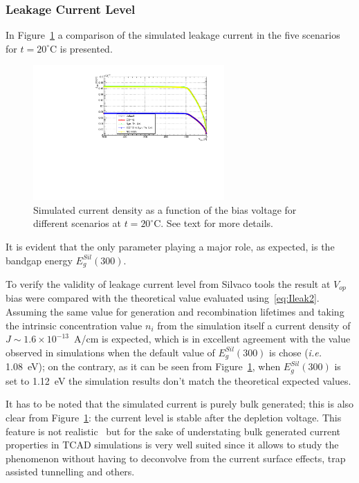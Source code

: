 \subsubsection{Leakage Current Level}




In Figure~\ref{fig:ILeak20C} a comparison of the simulated leakage current in the five scenarios for $t=20^{\circ}$C is presented.
\begin{figure}[!htbp]
\centering
\includegraphics[width=0.65\textwidth]{currents_T20_scenarios.pdf}
\caption{\label{fig:ILeak20C}Simulated current density as a function of the bias voltage for different 
scenarios at $t=20^{\circ}$C. See text for more details.}
\end{figure}
It is evident that the only parameter playing a major role, as expected, is the bandgap energy $E^{Sil}_g(300)$. 



To verify the validity of leakage current level  from Silvaco tools the result at $V_{op}$ bias 
were compared with the theoretical value evaluated using~\ref{eq:Ileak2}. Assuming the same value
for generation and recombination lifetimes and taking the intrinsic concentration value $n_i$ from 
the simulation itself a current density of $J\sim1.6\times10^{-13}$~A/cm is expected, which 
is in excellent agreement with the value observed in simulations when the default value of 
$E^{Sil}_g(300)$ is chose ({\it i.e.} 1.08~eV); on the contrary, as it can be seen from Figure~\ref{fig:ILeak20C}, when $E^{Sil}_g(300)$ is set to 1.12~eV the simulation results don't match 
the theoretical expected values.

It has to be noted that  the simulated current is purely bulk generated; this is also clear from 
Figure~\ref{fig:ILeak20C}: the current level is stable after the depletion voltage. This feature 
is not realistic~\cite{CALZOLARI19721003} but for the sake of understating bulk generated 
current properties in TCAD simulations is very well suited since it allows to study the 
phenomenon without having to deconvolve from the current surface effects, trap assisted tunnelling 
and others.

